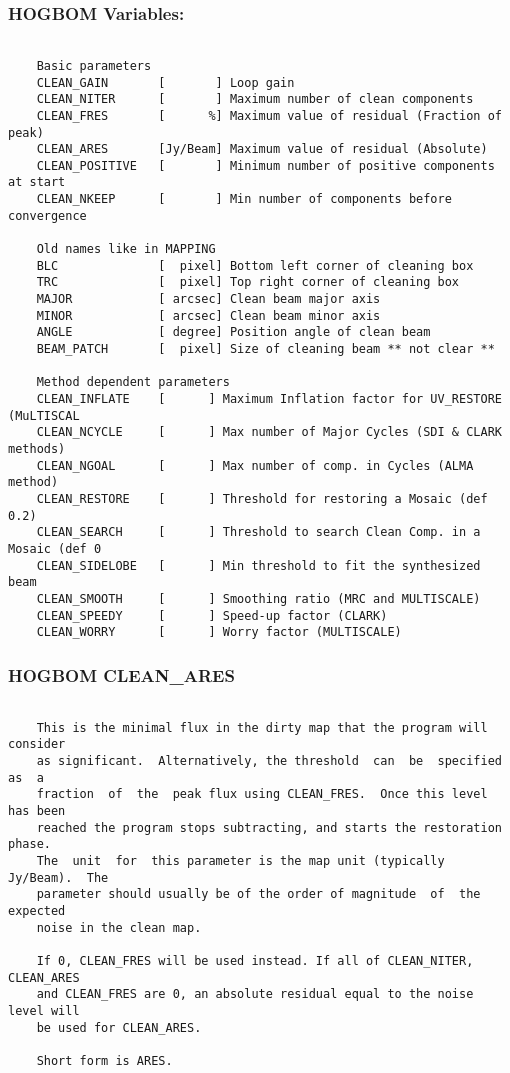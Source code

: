\subsubsection{HOGBOM Variables:}
\begin{verbatim}

    Basic parameters
    CLEAN_GAIN       [       ] Loop gain
    CLEAN_NITER      [       ] Maximum number of clean components
    CLEAN_FRES       [      %] Maximum value of residual (Fraction of peak)
    CLEAN_ARES       [Jy/Beam] Maximum value of residual (Absolute)
    CLEAN_POSITIVE   [       ] Minimum number of positive components at start
    CLEAN_NKEEP      [       ] Min number of components before convergence

    Old names like in MAPPING
    BLC              [  pixel] Bottom left corner of cleaning box
    TRC              [  pixel] Top right corner of cleaning box
    MAJOR            [ arcsec] Clean beam major axis
    MINOR            [ arcsec] Clean beam minor axis
    ANGLE            [ degree] Position angle of clean beam
    BEAM_PATCH       [  pixel] Size of cleaning beam ** not clear **

    Method dependent parameters
    CLEAN_INFLATE    [      ] Maximum Inflation factor for UV_RESTORE (MuLTISCAL
    CLEAN_NCYCLE     [      ] Max number of Major Cycles (SDI & CLARK methods)
    CLEAN_NGOAL      [      ] Max number of comp. in Cycles (ALMA method)
    CLEAN_RESTORE    [      ] Threshold for restoring a Mosaic (def 0.2)
    CLEAN_SEARCH     [      ] Threshold to search Clean Comp. in a Mosaic (def 0
    CLEAN_SIDELOBE   [      ] Min threshold to fit the synthesized beam
    CLEAN_SMOOTH     [      ] Smoothing ratio (MRC and MULTISCALE)
    CLEAN_SPEEDY     [      ] Speed-up factor (CLARK)
    CLEAN_WORRY      [      ] Worry factor (MULTISCALE)
\end{verbatim}
\subsubsection{HOGBOM CLEAN\_ARES}
\begin{verbatim}

    This is the minimal flux in the dirty map that the program will consider
    as significant.  Alternatively, the threshold  can  be  specified  as  a
    fraction  of  the  peak flux using CLEAN_FRES.  Once this level has been
    reached the program stops subtracting, and starts the restoration phase.
    The  unit  for  this parameter is the map unit (typically Jy/Beam).  The
    parameter should usually be of the order of magnitude  of  the  expected
    noise in the clean map.

    If 0, CLEAN_FRES will be used instead. If all of CLEAN_NITER, CLEAN_ARES
    and CLEAN_FRES are 0, an absolute residual equal to the noise level will
    be used for CLEAN_ARES.

    Short form is ARES.

\end{verbatim}
